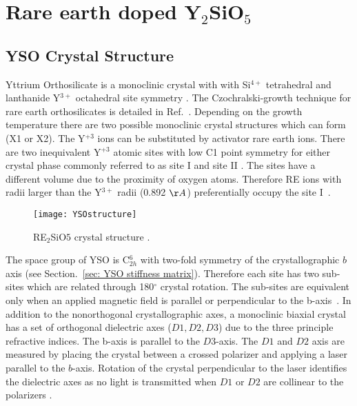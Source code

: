 \section{\label{sec:YSO}{Rare earth doped Y$_{2}$SiO$_{5}$}}

\subsection{YSO Crystal Structure}
Yttrium Orthosilicate is a monoclinic crystal with with Si$^{4+}$ tetrahedral and lanthanide Y$^{3+}$ octahedral site symmetry \citep{SHOUDU1999901}. The Czochralski-growth technique for rare earth orthosilicates is detailed in Ref.~\citep{MELCHER19931001}. Depending on the growth temperature there are two possible monoclinic crystal structures which can form (X1 or X2). The Y$^{+3}$ ions can be substituted by activator rare earth ions. There are two inequivalent Y$^{+3}$ atomic sites with low C1 point symmetry for either crystal phase commonly referred to as site I and site II \citep{doi:10.1021/jp5050207}. The sites have a different volume due to the proximity of oxygen atoms. Therefore RE ions with radii larger than the Y$^{3+}$ radii (0.892 $\AA$) preferentially occupy the site I~\citep{nikl2016nanocomposite}.     

\begin{figure}[h]
\centering
\texttt{[image: YSOstructure]}
\caption{\label{fig:YSOstructure} RE$_{2}$SiO$5$ crystal structure \citep{Ceramics}.}
\end{figure}


The space group of YSO is C$^{6}_{2h}$ with two-fold symmetry of the crystallographic $b$ axis (see Section.~\ref{sec: YSO stiffness matrix}). Therefore each site has two sub-sites which are related through 180$^{\circ}$ crystal rotation. The sub-sites are equivalent only when an applied magnetic field is parallel or perpendicular to the b-axis~\citep{PhysRevB.97.064409}. In addition to the nonorthogonal crystallographic axes, a monoclinic biaxial crystal has a set of orthogonal dielectric axes ($D1,D2,D3$) due to the three principle refractive indices. The b-axis is parallel to the $D3$-axis. The $D1$ and $D2$ axis are measured by placing the crystal between a crossed polarizer and applying a laser parallel to the $b$-axis. Rotation of the crystal perpendicular to the laser identifies the dielectric axes as no light is transmitted when $D1$ or $D2$ are collinear to the polarizers \citep{Traum:14}.     

